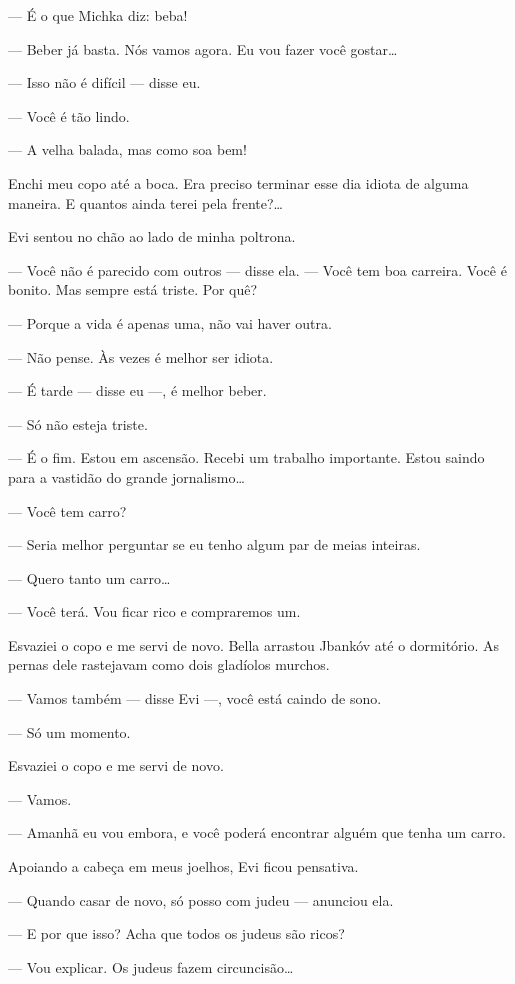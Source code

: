 --- É o que Michka diz: beba!

--- Beber já basta. Nós vamos agora. Eu vou fazer você gostar\ldots{}

--- Isso não é difícil --- disse eu.

--- Você é tão lindo.

--- A velha balada, mas como soa bem!

Enchi meu copo até a boca. Era preciso terminar esse dia idiota de
alguma maneira. E quantos ainda terei pela frente?\ldots{}

Evi sentou no chão ao lado de minha poltrona.

--- Você não é parecido com outros --- disse ela.
--- Você tem boa carreira. Você é bonito. Mas sempre está triste.
Por quê?

--- Porque a vida é apenas uma, não vai haver outra.

--- Não pense. Às vezes é melhor ser idiota.

--- É tarde --- disse eu ---, é melhor beber.

--- Só não esteja triste.

--- É o fim. Estou em ascensão. Recebi um trabalho importante.
Estou saindo para a vastidão do grande jornalismo\ldots{}

--- Você tem carro?

--- Seria melhor perguntar se eu tenho algum par de meias
inteiras.

--- Quero tanto um carro\ldots{}

--- Você terá. Vou ficar rico e compraremos um.

Esvaziei o copo e me servi de novo. Bella arrastou Jbankóv até o
dormitório. As pernas dele rastejavam como dois gladíolos murchos.

--- Vamos também --- disse Evi ---, você está
caindo de sono.

--- Só um momento.

Esvaziei o copo e me servi de novo.

--- Vamos.

--- Amanhã eu vou embora, e você poderá encontrar alguém que tenha um carro.

Apoiando a cabeça em meus joelhos, Evi ficou pensativa.

--- Quando casar de novo, só posso com judeu --- anunciou
ela.

--- E por que isso? Acha que todos os judeus são ricos?

--- Vou explicar. Os judeus fazem circuncisão\ldots{}

